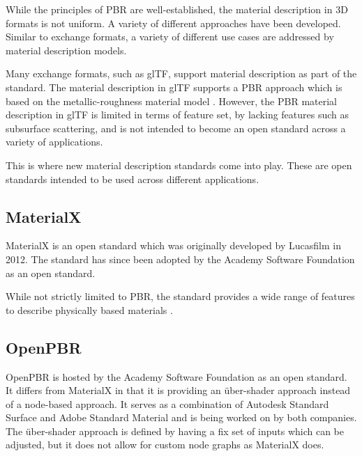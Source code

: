 While the principles of PBR are well-established, the material description in 3D formats is not uniform. A variety of different approaches have been developed. Similar to exchange formats, a variety of different use cases are addressed by material description models.

Many exchange formats, such as glTF, support material description as part of the standard. The material description in glTF supports a PBR approach which is based on the metallic-roughness material model . However, the PBR material description in glTF is limited in terms of feature set, by lacking features such as subsurface scattering, and is not intended to become an open standard across a variety of applications.

This is where new material description standards come into play. These are open standards intended to be used across different applications.

\subsection{MaterialX}

MaterialX is an open standard which was originally developed by Lucasfilm in 2012. The standard has since been adopted by the Academy Software Foundation as an open standard.

While not strictly limited to PBR, the standard provides a wide range of features to describe physically based materials \cite{Harrysson2019}.

\subsection{OpenPBR}

OpenPBR is hosted by the Academy Software Foundation as an open standard. It differs from MaterialX in that it is providing an über-shader approach instead of a node-based approach. It serves as a combination of Autodesk Standard Surface and Adobe Standard Material and is being worked on by both companies. The über-shader approach is defined by having a fix set of inputs which can be adjusted, but it does not allow for custom node graphs as MaterialX does.
